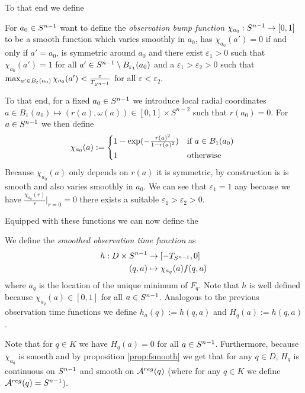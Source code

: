 To that end we define 
\begin{definition}\label{def:obsbumpfn}
    For $a_0\in {S^{n-1}}$ want to define the \emph{observation bump function} $\chi_{a_0}:{S^{n-1}}\to [0,1]$ to be a smooth function which varies smoothly in $a_0$, has $\chi_{a_0}(a')=0$ if and only if $a'=a_0$, is symmetric around $a_0$ and there exist $\varepsilon_1>0$ such that $\chi_{a_0}(a')=1$ for all $a'\in {S^{n-1}}\setminus B_{\varepsilon_1}(a_0)$ and a $\varepsilon_1 > \varepsilon_2 > 0$ such that $\max_{a'\in B_{\varepsilon}(a_0)} \chi_{a_0}(a')<\frac{\varepsilon}{T_{S^{n-1}}}$ for all $\varepsilon<\varepsilon_2$.

    To that end, for a fixed $a_0\in {S^{n-1}}$ we introduce local radial coordinates $a\in B_1(a_0)\mapsto (r(a),\omega(a))\in [0,1]\times S^{n-2}$ such that $r(a_0)=0$. For $a \in {S^{n-1}}$ we then define 
    \begin{equation*}
        \chi_{a_0}(a) := 
        \begin{cases*}
            1-\exp(-\frac{r(a)^2}{1-r(a)^2}) & if $a\in B_1(a_0)$ \\
            1 & otherwise
        \end{cases*}
    \end{equation*}
    Because $\chi_{a_0}(a)$ only depends on $r(a)$ it is symmetric, by construction is is smooth and also varies smoothly in $a_0$. We can see that $\varepsilon_1 = 1$ any because we have $\frac{\chi_{a_0}(r)}{r}\rvert_{r=0}=0$ there exists a suitable $\varepsilon_1 > \varepsilon_2 > 0$.
\end{definition}

Equipped with these functions we can now define the
\begin{definition}
    We define the \emph{smoothed observation time function} as 
    \begin{align*}
        h:D\times {S^{n-1}} &\to [-T_{S^{n-1}},0] \\
        (q,a)&\mapsto \chi_{a_q}(a)f(q,a)
    \end{align*}
    where $a_q$ is the location of the unique minimum of $F_q$. Note that $h$ is well defined because $\chi_{a_q}(a)\in [0,1]$ for all $a\in {S^{n-1}}$. 
    Analogous to the previous observation time functions we define $h_a(q):=h(q,a)$ and $H_q(a):=h(q,a)$.
\end{definition}
\begin{remark}
    Note that for $q\in K$ we have $H_q(a)=0$ for all $a\in {S^{n-1}}$. Furthermore, because $\chi_{a_q}$ is smooth and by proposition \ref{prop:fsmooth} we get that for any $q\in D$, $H_q$ is continuous on ${S^{n-1}}$ and smooth on ${{\mathcal{A}}^{reg}}(q)$ (where for any $q\in K$ we define ${{\mathcal{A}}^{reg}}(q)={S^{n-1}}$).
\end{remark}

